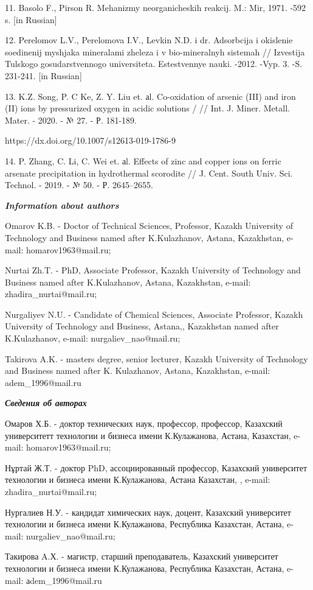 \begin{noparindent}
11. Basolo F., Pirson R. Mehanizmy neorganicheskih reakcij. M.: Mir,
1971. -592 s. {[}in Russian{]}

12. Perelomov L.V., Perelomova I.V., Levkin N.D. i dr. Adsorbcija i
okislenie soedinenij mysh\textquotesingle jaka mineralami zheleza i v
bio-mineral\textquotesingle nyh sistemah // Izvestija
Tul\textquotesingle skogo gosudarstvennogo universiteta. Estestvennye
nauki. -2012. -Vyp. 3. -S. 231-241. {[}in Russian{]}

13. K.Z. Song, P. C Ke, Z. Y. Liu et. аl. Co-oxidation of arsenic (III)
and iron (II) ions by pressurized oxygen in acidic solutions / // Int.
J. Miner. Metall. Mater. - 2020. - № 27. - Р. 181-189.

https://dx.doi.org/10.1007/s12613-019-1786-9

14. P. Zhang, C. Li, C. Wei et. аl. Effects of zinc and copper ions on
ferric arsenate precipitation in hydrothermal scorodite // J. Cent.
South Univ. Sci. Technol. - 2019. - № 50. - Р. 2645--2655.
\end{noparindent}

\emph{{\bfseries Information about authors}}

\begin{noparindent}
Omarov K.B. - Doctor of Technical Sciences, Professor, Kazakh University
of Technology and Business named after K.Kulazhanov, Astana, Kazakhstan,
e-mail: homarov1963@mail.ru;

Nurtai Zh.T. - PhD, Associate Professor, Kazakh University of Technology
and Business named after K.Kulazhanov, Astana, Kazakhstan, e-mail:
zhadira\_nurtai@mail.ru;

Nurgaliyev N.U. - Candidate of Chemical Sciences, Associate Professor,
Kazakh University of Technology and Business, Astana,, Kazakhstan named
after K.Kulazhanov, e-mail: nurgaliev\_nao@mail.ru;

Takirova A.K. - master\textquotesingle s degree, senior lecturer, Kazakh
University of Technology and Business named after K. Kulazhanov, Astana,
Kazakhstan, e-mail: adem\_1996@mail.ru
\end{noparindent}

\emph{{\bfseries Сведения об авторах}}

\begin{noparindent}
Омаров Х.Б. - доктор технических наук, профессор, профессор, Казахский
университетт технологии и бизнеса имени К.Кулажанова, Астана, Казахстан,
e-mail: homarov1963@mail.ru;

Нұртай Ж.Т. - доктор PhD, ассоциированный профессор, Казахский
университет технологии и бизнеса имени К.Кулажанова, Астана Казахстан, ,
e-mail: zhadira\_nurtai@mail.ru;

Нургалиев Н.У. - кандидат химических наук, доцент, Казахский университет
технологии и бизнеса имени К.Кулажанова, Республика Казахстан, Астана,
e-mail: nurgaliev\_nao@mail.ru;

Такирова A.Х. - магистр, старший преподаватель, Казахский университет
технологии и бизнеса имени К.Кулажанова, Республика Казахстан, Астана,
e-mail: аdem\_1996@mail.ru
\end{noparindent}
